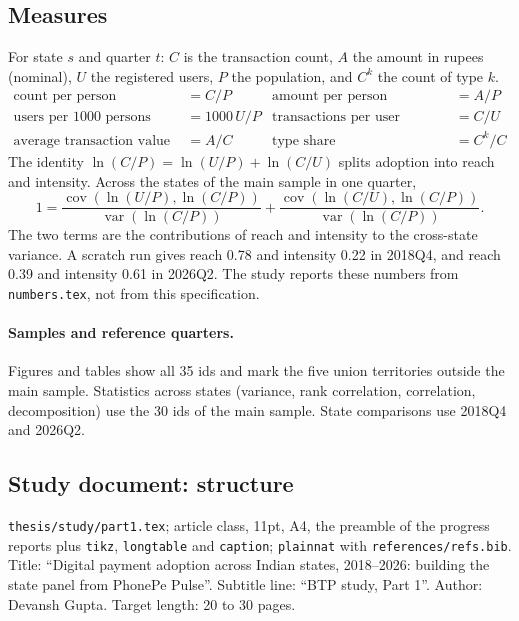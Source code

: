 \documentclass[11pt,a4paper]{article}
\newcommand{\f}[1]{\texttt{#1}}
\begin{document}
\subsection{Measures}
For state $s$ and quarter $t$: $C$ is the transaction count, $A$ the amount in rupees (nominal), $U$ the
registered users, $P$ the population, and $C^k$ the count of type $k$.
\begin{align*}
\text{count per person} &= C/P &
\text{amount per person} &= A/P \\
\text{users per 1000 persons (reach)} &= 1000\,U/P &
\text{transactions per user (intensity)} &= C/U \\
\text{average transaction value} &= A/C &
\text{type share} &= C^k / C
\end{align*}
The identity $\ln(C/P) = \ln(U/P) + \ln(C/U)$ splits adoption into reach and intensity. Across the
states of the main sample in one quarter,
\[
1 = \frac{\operatorname{cov}(\ln(U/P), \ln(C/P))}{\operatorname{var}(\ln(C/P))}
  + \frac{\operatorname{cov}(\ln(C/U), \ln(C/P))}{\operatorname{var}(\ln(C/P))}.
\]
The two terms are the contributions of reach and intensity to the cross-state variance. A scratch run
gives reach 0.78 and intensity 0.22 in 2018Q4, and reach 0.39 and intensity 0.61 in 2026Q2. The study
reports these numbers from \f{numbers.tex}, not from this specification.

\paragraph{Samples and reference quarters.} Figures and tables show all 35 ids and mark the five
union territories outside the main sample. Statistics across states (variance, rank correlation,
correlation, decomposition) use the 30 ids of the main sample. State comparisons use 2018Q4 and
2026Q2.

\subsection{Study document: structure}
\f{thesis/study/part1.tex}; article class, 11pt, A4, the preamble of the progress reports plus
\f{tikz}, \f{longtable} and \f{caption}; \f{plainnat} with \f{references/refs.bib}. Title: ``Digital
payment adoption across Indian states, 2018--2026: building the state panel from PhonePe Pulse''.
Subtitle line: ``BTP study, Part 1''. Author: Devansh Gupta. Target length: 20 to 30 pages.
\end{document}
